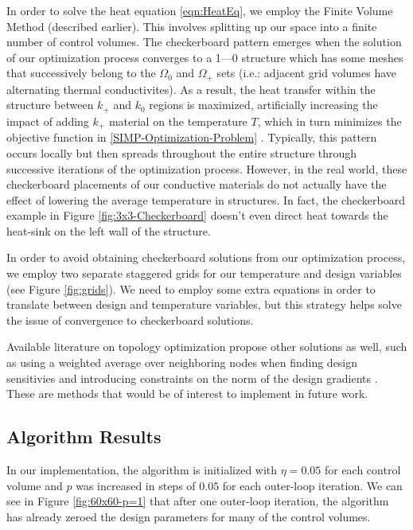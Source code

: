 In order to solve the heat equation \eqref{eqn:HeatEq}, we employ the Finite Volume Method (described earlier). This involves splitting up our space into a finite number of control volumes. The checkerboard pattern emerges when the solution of our optimization process converges to a 1---0 structure which has some meshes that successively belong to the $\Omega_0$ and $\Omega_+$ sets (i.e.: adjacent grid volumes have alternating thermal conductivites). As a result, the heat transfer within the structure between $k_+$ and $k_0$ regions is maximized, artificially increasing the impact of adding $k_+$ material on the temperature $T$, which in turn minimizes the objective function in \eqref{SIMP-Optimization-Problem} \cite{Versteeg2007}. Typically, this pattern occurs locally but then spreads throughout the entire structure through successive iterations of the optimization process. However, in the real world, these checkerboard placements of our conductive materials do not actually have the effect of lowering the average temperature in structures. In fact, the checkerboard example in Figure \ref{fig:3x3-Checkerboard} doesn't even direct heat towards the heat-sink on the left wall of the structure.

In order to avoid obtaining checkerboard solutions from our optimization process, we employ two separate staggered grids for our temperature and design variables (see Figure \ref{fig:grids}). We need to employ some extra equations in order to translate between design and temperature variables, but this strategy helps solve the issue of convergence to checkerboard solutions.

Available literature on topology optimization propose other solutions as well, such as using a weighted average over neighboring nodes when finding design sensitivies and introducing constraints on the norm of the design gradients \cite{Sigmund1998}. These are methods that would be of interest to implement in future work.

\subsection{Algorithm Results}

In our implementation, the algorithm is initialized with $\eta=0.05$ for each control volume and $p$ was increased in steps of $0.05$ for each outer-loop iteration. We can see in Figure \ref{fig:60x60-p=1} that after one outer-loop iteration, the algorithm has already zeroed the design parameters for many of the control volumes.

